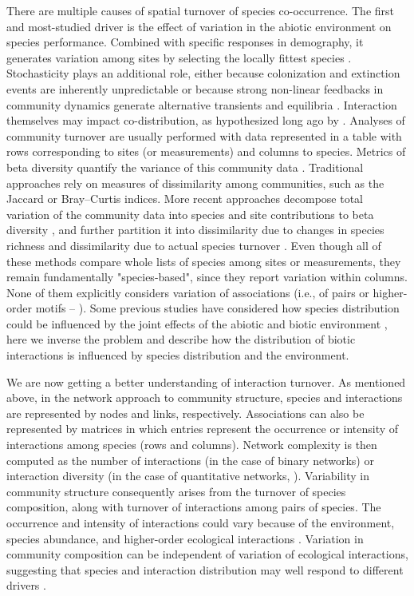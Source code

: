 \documentclass[12pt]{article}
\begin{document}
There are multiple causes of spatial turnover of species co-occurrence. The
first and most-studied driver is the effect of variation in the abiotic
environment on species performance. Combined with specific responses in
demography, it generates variation among sites by selecting the locally
fittest species \citep{Leibold2004a}. Stochasticity plays an additional role,
either because colonization and extinction events \citep{Hanski1999} are
inherently unpredictable or because strong non-linear feedbacks in community
dynamics generate alternative transients and equilibria \citep{Chase2007,
Vellend2014}. Interaction themselves may impact co-distribution, as
hypothesized long ago by \citet{Diamond1975}. Analyses of community turnover
are usually performed with data represented in a table with rows corresponding
to sites (or measurements) and columns to species. Metrics of beta diversity
quantify the variance of this community data \citep{Legendre2005}. Traditional
approaches rely on measures of dissimilarity among communities, such as the
Jaccard or Bray–Curtis indices. More recent approaches decompose total
variation of the community data into species and site contributions to beta
diversity \citep{Legendre2013}, and further partition it into dissimilarity
due to changes in species richness and dissimilarity due to actual species
turnover \citep{Baselga2010}. Even though all of these methods compare whole
lists of species among sites or measurements, they remain fundamentally
"species-based", since they report variation within columns. None of them
explicitly considers variation of associations (i.e., of pairs or higher-order
motifs – \citealt{Stouffer2007}). Some previous studies have considered how
species distribution could be influenced by the joint effects of the abiotic
and biotic environment \citep{Stephens2009, GonzalezSalasar2013, Cazelles2015,
Ovaskainen2017}, here we inverse the problem and describe how the distribution
of biotic interactions is influenced by species distribution and the
environment.

We are now getting a better understanding of interaction turnover. As
mentioned above, in the network approach to community structure, species and
interactions are represented by nodes and links, respectively. Associations
can also be represented by matrices in which entries represent the occurrence
or intensity of interactions among species (rows and columns). Network
complexity is then computed as the number of interactions (in the case of
binary networks) or interaction diversity (in the case of quantitative
networks, \citealt{Bersier2002}). Variability in community structure
consequently arises from the turnover of species composition, along with
turnover of interactions among pairs of species. The occurrence and intensity
of interactions could vary because of the environment, species abundance, and
higher-order ecological interactions \citep{Poisot2015a}. Variation in community
composition can be independent of variation of ecological
interactions, suggesting that species and interaction distribution may well
respond to different drivers \citep{Poisot2012}.
\end{document}
